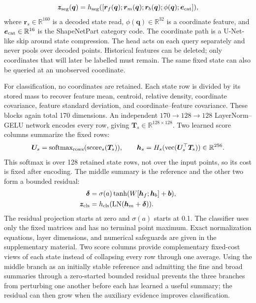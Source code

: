 \documentclass[times,twocolumn,final,authoryear]{elsarticle}
\newcommand{\R}{\mathbb{R}}
\newcommand{\vect}{\operatorname{vec}}
\begin{document}
\begin{equation}
\bm z_{\rm seg}(\bm q)=h_{\rm seg}([\bm r_f(\bm q);\bm r_m(\bm q);
\bm r_b(\bm q);\phi(\bm q);\bm e_{\rm cat}]),
\label{eq:seg-main}
\end{equation}
where $\bm r_s\in\R^{160}$ is a decoded state read, $\phi(\bm q)\in\R^{32}$ is a coordinate feature, and $\bm e_{\rm cat}\in\R^{16}$ is the ShapeNetPart category code. The coordinate path is a U-Net-like skip around state compression. The head acts on each query separately and never pools over decoded points. Historical features can be deleted; only coordinates that will later be labelled must remain. The same fixed state can also be queried at an unobserved coordinate.

For classification, no coordinates are retained. Each state row is divided by its stored mass to recover feature mean, centroid, relative density, coordinate covariance, feature standard deviation, and coordinate--feature covariance. These blocks again total 170 dimensions. An independent $170\rightarrow128\rightarrow128$ LayerNorm--GELU network encodes every row, giving $\bm T_s\in\R^{128\times128}$. Two learned score columns summarize the fixed rows:
\begin{equation}
\bm U_s=\operatorname{softmax}_{\rm rows}(\operatorname{score}_s(\bm T_s)),\qquad
\bm h_s=H_s(\vect(\bm U_s^\top\bm T_s))\in\R^{256}.
\label{eq:state-summary-main}
\end{equation}
This softmax is over 128 retained state rows, not over the input points, so its cost is fixed after encoding. The middle summary is the reference and the other two form a bounded residual:
\begin{align}
\bm\delta&=\sigma(a)\tanh(W[\bm h_f;\bm h_b]+\bm b),\nonumber\\
\bm z_{\rm cls}&=h_{\rm cls}(\operatorname{LN}(\bm h_m+\bm\delta)).
\label{eq:cls-main}
\end{align}
The residual projection starts at zero and $\sigma(a)$ starts at 0.1. The classifier uses only the fixed matrices and has no terminal point maximum. Exact normalization equations, layer dimensions, and numerical safeguards are given in the supplementary material.
Two score columns provide complementary fixed-cost views of each state instead of collapsing every row through one average. Using the middle branch as an initially stable reference and admitting the fine and broad summaries through a zero-started bounded residual prevents the three branches from perturbing one another before each has learned a useful summary; the residual can then grow when the auxiliary evidence improves classification.
\end{document}
